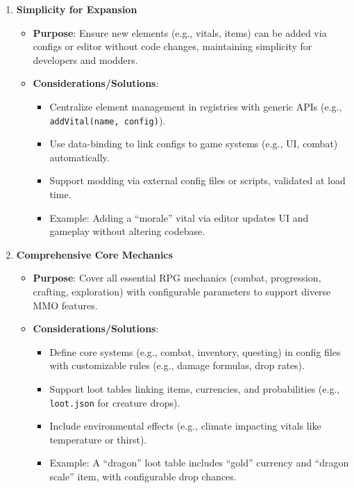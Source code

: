 \begin{enumerate}
    \item \textbf{Simplicity for Expansion}
        \begin{itemize}
            \item \textbf{Purpose}: Ensure new elements (e.g., vitals, items) can be added via configs or editor without code changes, maintaining simplicity for developers and modders.
            \item \textbf{Considerations/Solutions}:
                \begin{itemize}
                    \item Centralize element management in registries with generic APIs (e.g., \texttt{addVital(name, config)}).
                    \item Use data-binding to link configs to game systems (e.g., UI, combat) automatically.
                    \item Support modding via external config files or scripts, validated at load time.
                    \item Example: Adding a ``morale'' vital via editor updates UI and gameplay without altering codebase.
                \end{itemize}
        \end{itemize}

    \item \textbf{Comprehensive Core Mechanics}
        \begin{itemize}
            \item \textbf{Purpose}: Cover all essential RPG mechanics (combat, progression, crafting, exploration) with configurable parameters to support diverse MMO features.
            \item \textbf{Considerations/Solutions}:
                \begin{itemize}
                    \item Define core systems (e.g., combat, inventory, questing) in config files with customizable rules (e.g., damage formulas, drop rates).
                    \item Support loot tables linking items, currencies, and probabilities (e.g., \texttt{loot.json} for creature drops).
                    \item Include environmental effects (e.g., climate impacting vitals like temperature or thirst).
                    \item Example: A ``dragon'' loot table includes ``gold'' currency and ``dragon scale'' item, with configurable drop chances.
                \end{itemize}
        \end{itemize}


\end{enumerate}
